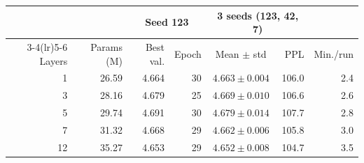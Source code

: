 \begin{tabular}{rrrrcrr}
\toprule
& & \multicolumn{2}{c}{Seed 123} & \multicolumn{2}{c}{3 seeds (123, 42, 7)} & \\
\cmidrule(lr){3-4}\cmidrule(lr){5-6}
Layers & Params (M) & Best val. & Epoch & Mean $\pm$ std & PPL & Min./run \\
\midrule
1 & 26.59 & 4.664 & 30 & $4.663 \pm 0.004$ & 106.0 & 2.4 \\
3 & 28.16 & 4.679 & 25 & $4.669 \pm 0.010$ & 106.6 & 2.6 \\
5 & 29.74 & 4.691 & 30 & $4.679 \pm 0.014$ & 107.7 & 2.8 \\
7 & 31.32 & 4.668 & 29 & $4.662 \pm 0.006$ & 105.8 & 3.0 \\
12 & 35.27 & 4.653 & 29 & $4.652 \pm 0.008$ & 104.7 & 3.5 \\
\bottomrule
\end{tabular}

